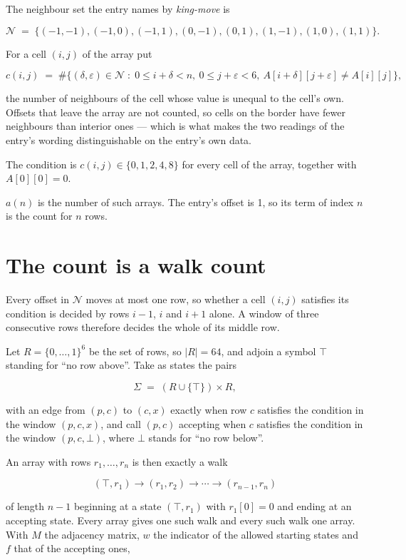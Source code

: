 \documentclass[11pt]{article}
\theoremstyle{definition}
\begin{document}
The neighbour set the entry names by {\itshape king-move} is

\[\mathcal{N} \;=\; \{(-1,-1), (-1,0), (-1,1), (0,-1), (0,1), (1,-1), (1,0), (1,1)\}.\]

For a cell $(i,j)$ of the array put

\[c(i,j) \;=\; \#\bigl\{(\delta,\varepsilon)\in\mathcal{N} \;:\; 0\le i+\delta<n,\ 0\le j+\varepsilon<6,\ A[i+\delta][j+\varepsilon] \neq A[i][j]\bigr\},\]

the number of neighbours of the cell whose value is unequal to the cell's own. Offsets that leave the array are not counted, so cells on the border have fewer neighbours than interior ones --- which is what makes the two readings of the entry's wording distinguishable on the entry's own data.

The condition is $c(i,j) \in \{0, 1, 2, 4, 8\}$ for every cell of the array, together with $A[0][0]=0$.

$a(n)$ is the number of such arrays. The entry's offset is 1, so its term of index $n$ is the count for $n$ rows.

\section{The count is a walk count}

Every offset in $\mathcal{N}$ moves at most one row, so whether a cell $(i,j)$ satisfies its condition is decided by rows $i-1$, $i$ and $i+1$ alone. A window of three consecutive rows therefore decides the whole of its middle row.

Let $R = \{0,\dots,1\}^{6}$ be the set of rows, so $|R| = 64$, and adjoin a symbol $\top$ standing for ``no row above''. Take as states the pairs

\[\Sigma \;=\; (R \cup \{\top\}) \times R,\]

with an edge from $(p,c)$ to $(c,x)$ exactly when row $c$ satisfies the condition in the window $(p,c,x)$, and call $(p,c)$ accepting when $c$ satisfies the condition in the window $(p,c,\bot)$, where $\bot$ stands for ``no row below''.

An array with rows $r_1,\dots,r_n$ is then exactly a walk

\[(\top,r_1) \to (r_1,r_2) \to \cdots \to (r_{n-1},r_n)\]

of length $n-1$ beginning at a state $(\top,r_1)$ with $r_1[0]=0$ and ending at an accepting state. Every array gives one such walk and every such walk one array. With $M$ the adjacency matrix, $w$ the indicator of the allowed starting states and $f$ that of the accepting ones,
\end{document}
